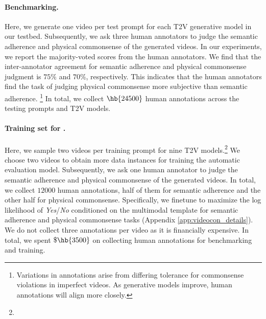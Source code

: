 \paragraph{Benchmarking.} Here, we generate one video per test prompt for each T2V generative model in our testbed. Subsequently, we ask three human annotators to judge the semantic adherence and physical commonsense of the generated videos. In our experiments, we report the majority-voted scores from the human annotators. We find that the inter-annotator agreement for semantic adherence and physical commonsense judgment is $75\%$ and $70\%$, respectively. This indicates that the human annotators find the task of judging physical commonsense more subjective than semantic adherence. \footnote{Variations in annotations arise from differing tolerance for commonsense violations in imperfect videos. As generative models improve, human annotations will align more closely.} In total, we collect $\hb{24500}$ human annotations across the testing prompts and T2V models.


\paragraph{Training set for \model{}.} Here, we sample two videos per training prompt for nine T2V models.\footnote{} We choose two videos to obtain more data instances for training the automatic evaluation model. Subsequently, we ask one human annotator to judge the semantic adherence and physical commonsense of the generated videos. In total, we collect $12000$ human annotations, half of them for semantic adherence and the other half for physical commonsense. Specifically, we finetune \videocon{} to maximize the log likelihood of \textit{Yes}/\textit{No} conditioned on the multimodal template for semantic adherence and physical commonsense tasks (Appendix \ref{app:videocon_details}). We do not collect three annotations per video as it is financially expensive. In total, we spent $\$\hb{3500}$ on collecting human annotations for benchmarking and training.

